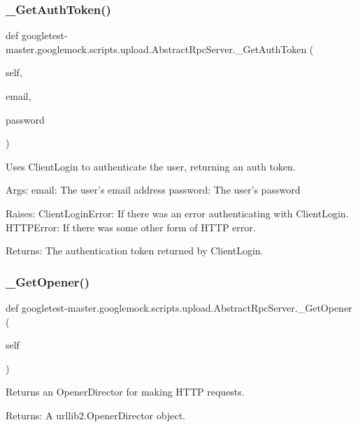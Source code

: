 \subsubsection{\texorpdfstring{\_GetAuthToken()}{\_GetAuthToken()}}
{\footnotesize\ttfamily def googletest-\/master.\+googlemock.\+scripts.\+upload.\+Abstract\+Rpc\+Server.\+\_\+\+Get\+Auth\+Token (\begin{DoxyParamCaption}\item[{}]{self,  }\item[{}]{email,  }\item[{}]{password }\end{DoxyParamCaption})\hspace{0.3cm}{\ttfamily [private]}}

\begin{DoxyVerb}Uses ClientLogin to authenticate the user, returning an auth token.

Args:
  email:    The user's email address
  password: The user's password

Raises:
  ClientLoginError: If there was an error authenticating with ClientLogin.
  HTTPError: If there was some other form of HTTP error.

Returns:
  The authentication token returned by ClientLogin.
\end{DoxyVerb}
 \mbox{\label{classgoogletest-master_1_1googlemock_1_1scripts_1_1upload_1_1_abstract_rpc_server_abffff202772c5ede566f04f2e77d0b08}} 
\subsubsection{\texorpdfstring{\_GetOpener()}{\_GetOpener()}}
{\footnotesize\ttfamily def googletest-\/master.\+googlemock.\+scripts.\+upload.\+Abstract\+Rpc\+Server.\+\_\+\+Get\+Opener (\begin{DoxyParamCaption}\item[{}]{self }\end{DoxyParamCaption})\hspace{0.3cm}{\ttfamily [private]}}

\begin{DoxyVerb}Returns an OpenerDirector for making HTTP requests.

Returns:
  A urllib2.OpenerDirector object.
\end{DoxyVerb}
 

